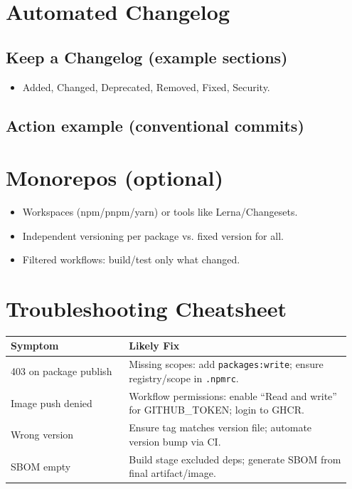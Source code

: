 \documentclass[11pt]{article}
\begin{document}
\section{Automated Changelog}
\subsection{Keep a Changelog (example sections)}
\begin{itemize}
  \item Added, Changed, Deprecated, Removed, Fixed, Security.
\end{itemize}

\subsection{Action example (conventional commits)}

\section{Monorepos (optional)}
\begin{itemize}
  \item Workspaces (npm/pnpm/yarn) or tools like Lerna/Changesets.
  \item Independent versioning per package vs. fixed version for all.
  \item Filtered workflows: build/test only what changed.
\end{itemize}

\section{Troubleshooting Cheatsheet}
\begin{tabular}{@{}p{0.33\linewidth}p{0.62\linewidth}@{}}
\toprule
\textbf{Symptom} & \textbf{Likely Fix} \\ \midrule
403 on package publish & Missing scopes: add \texttt{packages:write}; ensure registry/scope in \texttt{.npmrc}. \\
Image push denied & Workflow permissions: enable ``Read and write'' for GITHUB\_TOKEN; login to GHCR. \\
Wrong version & Ensure tag matches version file; automate version bump via CI. \\
SBOM empty & Build stage excluded deps; generate SBOM from final artifact/image. \\
\bottomrule
\end{tabular}
\end{document}

